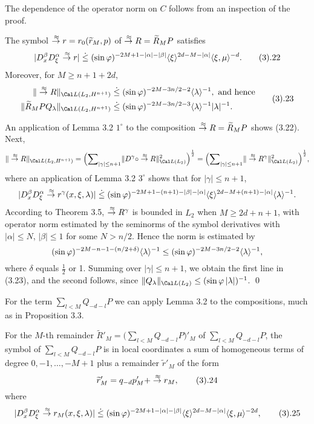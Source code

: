 The dependence of the operator norm on $C$ follows from an inspection
of the proof.


The symbol $\overset{\,\approx}\to r=r_0(\widetilde
r_M,p)$ of $\overset{\,\approx}\to R=\widetilde R_MP$ satisfies
$$
|D_x^\beta D_\xi ^\alpha \ttilde r| \leg
(\sin\varphi)^{-2M+1-|\alpha|-|\beta|}\ang\xi^{2d-M-|\alpha|}
\ang{\xi ,\mu }^{-d}.\tag3.22
$$
Moreover, for $M\ge n+1+2d$,
$$
\aligned
\|\ttilde R \|_{\Cal L(L_2, H^{n+1})}&\leg (\sin\varphi )^{-2M-3n/2-2
}\ang\lambda ^{-1},\text{ and hence}\\
\|\widetilde R_MPQ_\lambda  \|_{\Cal L(L_2, H^{n+1})}&\leg (\sin\varphi )^{-2M-3n/2-3
}\ang\lambda ^{-1}|\lambda |^{-1}.
\endaligned\tag3.23
$$

\endproclaim

An application of  Lemma 3.2 $1^\circ$ to the composition $\overset{\,\approx}\to
R=\widetilde R_MP$ shows (3.22).
 Next,
$$
\|\ttilde R\|_{\Cal L(L_2, H^{n+1})}=\Bigl({\sum}_{|\gamma |\le n+1}\|D^\gamma \circ\ttilde R \|^2_{\Cal
L(L_2)}\Bigr)^\frac12=\Bigl({\sum}_{|\gamma |\le n+1}\|\ttilde R^\gamma  \|^2_{\Cal
L(L_2)}\Bigr)^\frac12,
$$
where an application of Lemma 3.2 $3^\circ$
shows  that for $|\gamma |\le n+1$,
$$
|D_x^\beta D_\xi ^\alpha \overset{\,\approx}\to r^\gamma (x,\xi ,\lambda )|\;\dot{\le}\;
(\sin\varphi )^{-2M+1-(n+1)-|\beta |-|\alpha |}\langle {\xi} \rangle ^{2d-M+(n+1)-|\alpha |}\langle {\lambda} \rangle ^{-1}.
$$
According to Theorem 3.5, $\overset{\,\approx}\to R^\gamma $ is bounded in $L_2$
when $M\ge 2d+n+1$, with operator norm estimated by the seminorms of the
symbol derivatives with $|\alpha |\le N$, $|\beta |\le 1$ for some  $N>
n/2$. Hence the norm is estimated by
$$
(\sin\varphi )^{-2M-n-1-(n/2+\delta ) }\langle {\lambda} \rangle ^{-1}\le(\sin\varphi )^{-2M-3n/2-2 }\langle {\lambda} \rangle ^{-1},
$$
where $\delta $ equals $\frac12$ or 1. Summing over $|\gamma |\le
n+1$, we obtain the first line in (3.23), and the second follows,
since $\|Q_\lambda \|_{\Cal L(L_2)}\le (\sin\varphi \,|\lambda
|)^{-1}$.
\qed
\enddemo




For the term ${\sum}_{l<M}Q_{-d-l}P$ we can apply Lemma 3.2 to the
compositions, much as in Proposition 3.3.

 For the $M$-th remainder $\widetilde
R'_M=\bigl({\sum}_{l<M}Q_{-d-l}P\bigr)'_M$ of ${\sum}_{l<M}Q_{-d-l}P$,
the symbol of ${\sum}_{l<M}Q_{-d-l}P$ is in
local coordinates
a sum of homogeneous terms of degree
$0,-1,\dots,-M+1$ plus a remainder $\widetilde r'_M$ of the form
$$
\widetilde r'_M=q_{-d}p'_M+\ttilde r_M,\tag3.24
$$
where
$$
|D_x^\beta D_\xi^\alpha \ttilde r_{{M}}(x,\xi ,\lambda )|\leg
(\sin\varphi)^{- 2M +
1-|\alpha|-|\beta|}\ang\xi^{2d-{M}-|\alpha|}\ang{\xi ,\mu }^{-2d},
\tag3.25
$$
\endproclaim

